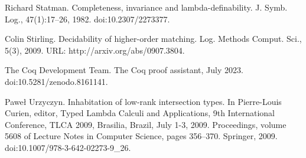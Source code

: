 \par\noindent  [17]  Richard Statman.  Completeness, invariance and lambda-definability.  J. Symb. Log., 47(1):17–26, 1982.  doi:10.2307/2273377.  
 
\par\noindent  [18]  Colin Stirling.  Decidability of higher-order matching.  Log. Methods Comput. Sci., 5(3), 2009.  URL: http://arxiv.org/abs/0907.3804.  
 
\par\noindent  [19]  The Coq Development Team.  The Coq proof assistant, July 2023.  doi:10.5281/zenodo.8161141.  
 
\par\noindent  [20]  Paweł Urzyczyn.  Inhabitation of low-rank intersection types.  In Pierre-Louis Curien, editor, Typed Lambda Calculi and Applications, 9th International Conference, TLCA 2009, Brasilia, Brazil, July 1-3, 2009. Proceedings, volume 5608 of Lecture Notes in Computer Science, pages 356–370. Springer, 2009.  doi:10.1007/978-3-642-02273-9\_26.  
  
